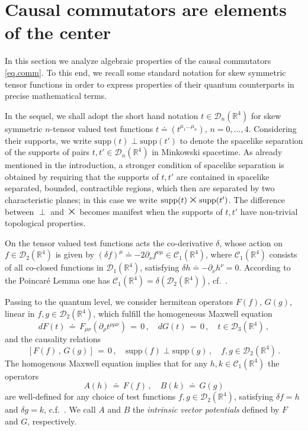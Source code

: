 \documentclass[11pt]{article}
\numberwithin{equation}{section}
\newcommand{\RR}{{\mathbb R}}
\newcommand{\Cc}{{\mathcal{C}}}
\newcommand{\Dc}{{\mathcal{D}}}
\newcommand{\Times}{\mbox{\Large $\times$}}      %
\newcommand{\supp}{{\mathrm{supp}}}
\begin{document}
\section{Causal commutators are elements of the center}
\label{sec2}

In this section we analyze algebraic properties of the   
causal commutators 
\eqref{eq.comm}. To this end, we recall some standard
notation for skew symmetric 
tensor functions in order to express  
properties of their quantum counterparts in precise mathematical terms. 

\medskip
In the sequel, we shall adopt the short hand notation $t \in \Dc_n(\RR^4)$
for skew symmetric $n$-tensor valued test functions
$t \doteq (t^{\mu_1 \ldots \mu_n})$, $n = 0, \dots, 4$. Considering their 
supports, we write $\supp(t) \perp \supp(t')$ to denote 
the spacelike separation of the supports 
of pairs $t,t' \in \Dc_n(\RR^4)$ in Minkowski spacetime. 
As already mentioned in the introduction, a stronger condition 
of spacelike separation is obtained by requiring that the 
supports of $t,t'$  are contained in 
spacelike separated, bounded, contractible regions,
which then are separated by two characteristic planes; 
in this case we write
%
$\supp(t) \, \Times \, \supp(t')$.
%
The difference between $\perp$ and $\Times$ becomes manifest when 
the supports of $t,t'$ have non-trivial topological properties.

\medskip
On the tensor valued test functions acts 
the co-derivative $\delta$, whose action on $f \in \Dc_2(\RR^4)$ 
is given by  
$(\delta f)^\mu \doteq -2\partial_\nu f^{\nu \mu} \in \Cc_1(\RR^4)$,
where $\Cc_1(\RR^4)$ consists of all co-closed
functions in \mbox{$\Dc_1(\RR^4)$}, satisfying   
$\delta h \doteq - \partial_\nu h^\nu = 0$.
According to the Poincar\'e Lemma one has 
$\Cc_1(\RR^4) = \delta(\Dc_2(\RR^4))$, 
cf.\ \cite{BuCiRuVa1}.

\medskip 
Passing to the quantum level, we 
consider hermitean operators 
%
$F(f)$, $G(g)$,
%
linear in $f,g \in \Dc_2(\RR^4)$, 
which fulfill the homogeneous Maxwell equation
%
\begin{equation}
\label{eq.maxw}
dF(t) \, \doteq \, F_{\mu\nu}(\partial_\rho t^{\rho\mu\nu}) \, = \, 0 \, ,
\quad dG(t) \, = \, 0 \, , \quad t \in \Dc_3(\RR^4) \, ,
\end{equation}
%
and the causality relations
%
\begin{equation}
\label{eq.caus}
[ F(f) \, , \, G(g) ] \, = \, 0 \, , \quad 
\supp(f) \perp \supp(g) \, , \quad f,g \in \Dc_2(\RR^4) \, .
\end{equation}
%
The homogenous Maxwell equation implies that for any
$h, k \in \Cc_1(\RR^4)$ the operators
%
$$
A(h) \, \doteq   \, F(f) \, , \quad B(k) \, \doteq \, G(g)
$$
%
are well-defined for any choice of 
test functions $f,g \in \Dc_2(\RR^4)$, satisfying  
$\delta f = h$ and $\delta g = k$, c.f.\ \cite{BuCiRuVa1}. 
We call $A$ and $B$ the \emph{intrinsic vector potentials} 
defined by $F$ and $G$, respectively.
\end{document}
